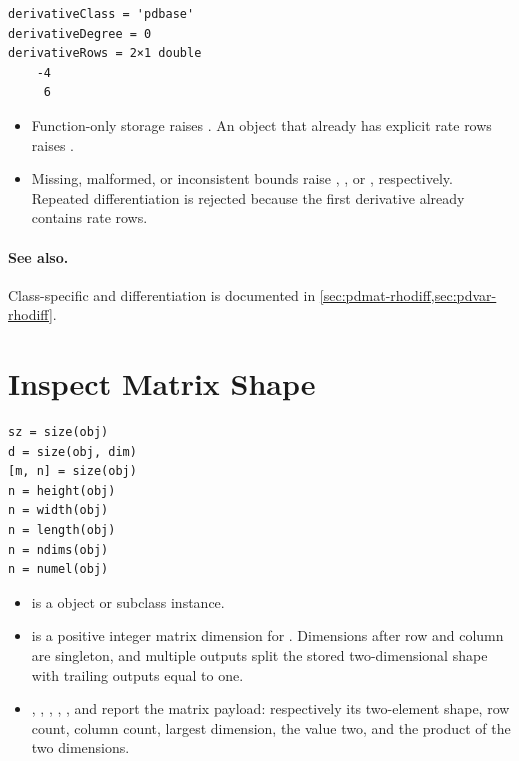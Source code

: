 \begin{lstlisting}[style=dpoutput]
derivativeClass = 'pdbase'
derivativeDegree = 0
derivativeRows = 2×1 double
    -4
     6
\end{lstlisting}

\remarkshead
\begin{itemize}[leftmargin=*]
    \item Function-only storage raises . An object that already has explicit rate rows raises .
    \item Missing, malformed, or inconsistent bounds raise , , or , respectively. Repeated differentiation is rejected because the first derivative already contains rate rows.
\end{itemize}

\paragraph{See also.} Class-specific  and  differentiation is documented in \cref{sec:pdmat-rhodiff,sec:pdvar-rhodiff}.

\section{Inspect Matrix Shape}
\label{sec:pdbase-shape}

\syntaxhead
\begin{lstlisting}[style=dpsyntax]
sz = size(obj)
d = size(obj, dim)
[m, n] = size(obj)
n = height(obj)
n = width(obj)
n = length(obj)
n = ndims(obj)
n = numel(obj)
\end{lstlisting}

\arghead
\begin{itemize}[leftmargin=*]
    \item {} is a  object or subclass instance.\par

    \item {} is a positive integer matrix dimension for . Dimensions after row and column are singleton, and multiple outputs split the stored two-dimensional shape with trailing outputs equal to one.\par

    \item {}, , , , , and  report the matrix payload: respectively its two-element shape, row count, column count, largest dimension, the value two, and the product of the two dimensions.
\end{itemize}

